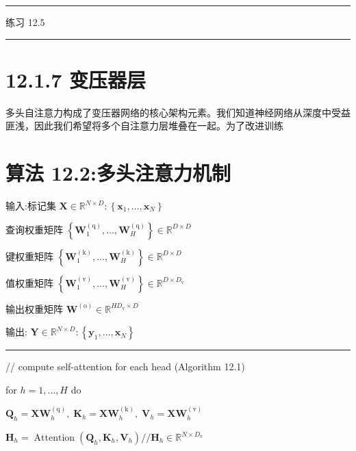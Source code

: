 \documentclass[10pt]{article}
\newcommand{\HRule}{\begin{center}\rule{0.9\linewidth}{0.2mm}\end{center}}
\begin{document}
\HRule

练习 12.5

\HRule

\section*{12.1.7 变压器层}

多头自注意力构成了变压器网络的核心架构元素。我们知道神经网络从深度中受益匪浅，因此我们希望将多个自注意力层堆叠在一起。为了改进训练

\section*{算法 12.2:多头注意力机制}

输入:标记集 \(\mathbf{X} \in  {\mathbb{R}}^{N \times  D} : \left\{  {{\mathbf{x}}_{1},\ldots ,{\mathbf{x}}_{N}}\right\}\)

查询权重矩阵 \(\left\{  {{\mathbf{W}}_{1}^{\left( \mathrm{q}\right) },\ldots ,{\mathbf{W}}_{H}^{\left( \mathrm{q}\right) }}\right\}   \in  {\mathbb{R}}^{D \times  D}\)

键权重矩阵 \(\left\{  {{\mathbf{W}}_{1}^{\left( \mathrm{k}\right) },\ldots ,{\mathbf{W}}_{H}^{\left( \mathrm{k}\right) }}\right\}   \in  {\mathbb{R}}^{D \times  D}\)

值权重矩阵 \(\left\{  {{\mathbf{W}}_{1}^{\left( \mathrm{v}\right) },\ldots ,{\mathbf{W}}_{H}^{\left( \mathrm{v}\right) }}\right\}   \in  {\mathbb{R}}^{D \times  {D}_{\mathrm{v}}}\)

输出权重矩阵 \({\mathbf{W}}^{\left( \mathrm{o}\right) } \in  {\mathbb{R}}^{H{D}_{\mathrm{v}} \times  D}\)

输出: \(\mathbf{Y} \in  {\mathbb{R}}^{N \times  D} : \left\{  {{\mathbf{y}}_{1},\ldots ,{\mathbf{x}}_{N}}\right\}\)

\HRule

// compute self-attention for each head (Algorithm 12.1)

for \(h = 1,\ldots ,H\) do

\hspace*{1em} \({\mathbf{Q}}_{h} = {\mathbf{{XW}}}_{h}^{\left( \mathrm{q}\right) },\;{\mathbf{K}}_{h} = {\mathbf{{XW}}}_{h}^{\left( \mathrm{k}\right) },\;{\mathbf{V}}_{h} = {\mathbf{{XW}}}_{h}^{\left( \mathrm{v}\right) }\)

\hspace*{1em} \({\mathbf{H}}_{h} = \operatorname{Attention}\left( {{\mathbf{Q}}_{h},{\mathbf{K}}_{h},{\mathbf{V}}_{h}}\right) //{\mathbf{H}}_{h} \in  {\mathbb{R}}^{N \times  {D}_{\mathrm{v}}}\)
\end{document}
